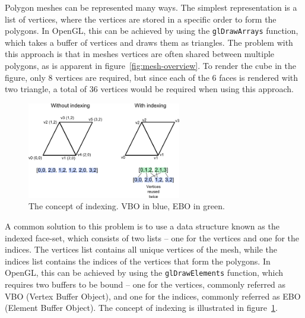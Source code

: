 Polygon meshes can be represented many ways.
The simplest representation is a list of vertices, where the vertices are stored in a specific order to form the polygons.
In OpenGL, this can be achieved by using the \texttt{glDrawArrays} function,
which takes a buffer of vertices and draws them as triangles.
The problem with this approach is that in meshes vertices are often shared between multiple polygons,
as is apparent in figure~\ref{fig:mesh-overview}.
To render the cube in the figure, only 8 vertices are required,
but since each of the 6 faces is rendered with two triangle,
a total of 36 vertices would be required when using this approach.~\cite{dorner_virtual_2019, de_vries_learn_2020}


\begin{figure}[h]
    \centering
    \includegraphics[width=0.60\textwidth]{images/index_buffer}
    \caption{The concept of indexing. VBO in blue, EBO in green.}
    \label{fig:index-buffer}
\end{figure}

A common solution to this problem is to use a data structure known as the indexed face-set, which consists of two lists -- one for the vertices and one for the indices.
The vertices list contains all unique vertices of the mesh, while the indices list contains the indices of the vertices that form the polygons.
In OpenGL, this can be achieved by using the \texttt{glDrawElements} function, which requires two buffers to be bound
-- one for the vertices, commonly referred as VBO (Vertex Buffer Object), and one for the indices, commonly referred as EBO (Element Buffer Object).
The concept of indexing is illustrated in figure~\ref{fig:index-buffer}.~\cite{dorner_virtual_2019, de_vries_learn_2020}



